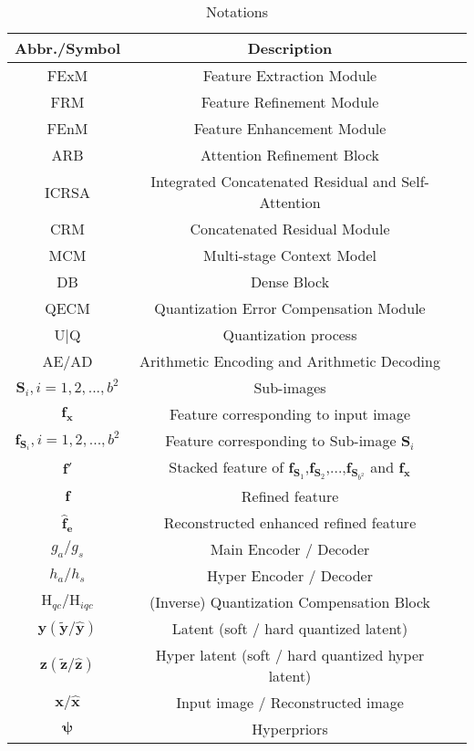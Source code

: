 \begin{table}
  \caption{Notations}
  \label{tab:Notations}
  \begin{tabular}{ccl}
    \toprule
    Abbr./Symbol &Description\\
    \midrule
    FExM & Feature Extraction Module\\
	FRM & Feature Refinement Module\\
	FEnM & Feature Enhancement Module\\
	ARB & Attention Refinement Block\\
	ICRSA & Integrated Concatenated Residual and Self-Attention\\
	CRM & Concatenated Residual Module\\
	MCM  & Multi-stage Context Model\\
	DB & Dense Block\\
	QECM & Quantization Error Compensation Module\\
	U$\mid$Q & Quantization process\\
	AE/AD & Arithmetic Encoding and Arithmetic Decoding\\
	\midrule
	$\bm{S}_{i},i=1,2,...,b^2$ & Sub-images\\
	$\bm{f_x}$ & Feature corresponding to input image \bm{$x$}\\
	$\bm{f}_{\bm{S}_{i}},i=1,2,...,b^2$ & Feature corresponding to Sub-image $\bm{S}_{i}$\\
	$\bm{f'}$ & Stacked feature of $\bm{f}_{\bm{S}_1}$,$\bm{f}_{\bm{S}_2}$,$...$,$\bm{f}_{\bm{S}_{b^2}}$ and $\bm{f_x}$ \\
	$\bm{f}$ & Refined feature\\
	$\bm{\hat{f}_e}$ & Reconstructed enhanced refined feature\\
	$g_a/g_s$ & Main Encoder / Decoder\\
	$h_a/h_s$ & Hyper Encoder / Decoder\\
	$\text{H}_{qc}/\text{H}_{iqc}$ & (Inverse) Quantization Compensation Block \\
	$\bm{y}(\bm{\tilde{y}/\bm{\hat{y}}})$ & Latent (soft / hard quantized latent)\\
	$\bm{z}(\bm{\tilde{z}}/\bm{\hat{z}})$ & Hyper latent (soft / hard quantized hyper latent)\\
	$\bm{x}/ \bm{\hat{x}} $ & Input image / Reconstructed image\\
	$\bm{\psi}$ & Hyperpriors\\
    \bottomrule
	\end{tabular}
\end{table}

